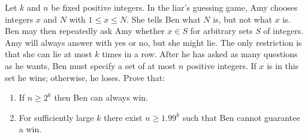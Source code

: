 Let $k$ and $n$ be fixed positive integers. In the liar's guessing game, Amy chooses integers $x$ and $N$ with $1 \leq x \leq N$. She tells Ben what $N$ is, but not what $x$ is. Ben may then repeatedly ask Amy whether $x \in S$ for arbitrary sets $S$ of integers. Amy will always answer with yes or no, but she might lie. The only restriction is that she can lie at most $k$ times in a row. After he has asked as many questions as he wants, Ben must specify a set of at most $n$ positive integers. If $x$ is in this set he wins; otherwise, he loses. Prove that:

\begin{enumerate}
\item[(a)] If $n \geq 2^{k}$ then Ben can always win.
\item[(b)] For sufficiently large $k$ there exist $n \geq 1.99^{k}$ such that Ben cannot guarantee a win.
\end{enumerate}
